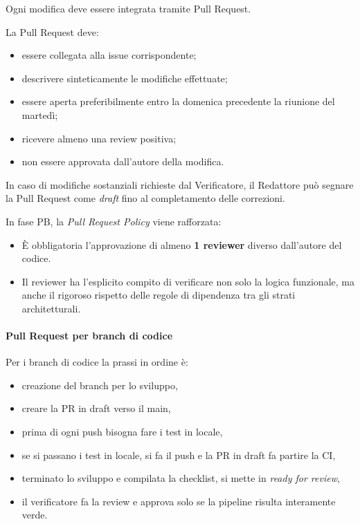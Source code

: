 Ogni modifica deve essere integrata tramite Pull Request.

La Pull Request deve:

\begin{itemize}
    \item essere collegata alla issue corrispondente;
    \item descrivere sinteticamente le modifiche effettuate;
    \item essere aperta preferibilmente entro la domenica precedente la riunione del
    martedì;
    \item ricevere almeno una review positiva;
    \item non essere approvata dall'autore della modifica.
\end{itemize}

In caso di modifiche sostanziali richieste dal Verificatore, il Redattore può
segnare la Pull Request come \textit{draft} fino al completamento delle correzioni.

In fase PB, la \textit{Pull Request Policy} viene rafforzata:
\begin{itemize}
    \item È obbligatoria l'approvazione di almeno \textbf{1 reviewer} diverso dall'autore del codice. 
    \item Il reviewer ha l'esplicito compito di verificare non solo la logica funzionale, ma anche il rigoroso rispetto delle regole di dipendenza tra gli strati architetturali.
\end{itemize}


\paragraph{Pull Request per branch di codice}

Per i branch di codice la prassi in ordine è:

\begin{itemize}
    \item creazione del branch per lo sviluppo,
    \item creare la PR in draft verso il main,
    \item prima di ogni push bisogna fare i test in locale,
    \item se si passano i test in locale, si fa il push e la PR in draft fa partire la CI,
    \item terminato lo sviluppo e compilata la checklist, si mette in \textit{ready for review},
    \item il verificatore fa la review e approva solo se la pipeline risulta interamente verde.
\end{itemize}


